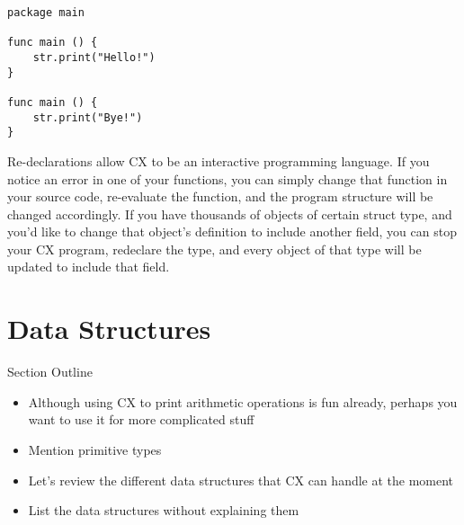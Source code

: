 \documentclass[11pt,fleqn,openany]{book} %
\begin{document}
\begin{lstlisting}[caption={Example Function Redefinition},captionpos=b,label={listing:example-redefinition}]
package main

func main () {
	str.print("Hello!")
}

func main () {
	str.print("Bye!")
}
\end{lstlisting}

Re-declarations allow CX to be an interactive programming language. If you notice an error in one of your functions, you can simply change that function in your source code, re-evaluate the function, and the program structure will be changed accordingly. If you have thousands of objects of certain struct type, and you'd like to change that object's definition to include another field, you can stop your CX program, redeclare the type, and every object of that type will be updated to include that field.




\chapter{Data Structures}
\label{chapter:data-structures}

\begin{remark}
Section Outline
    \begin{itemize}
    	\item Although using CX to print arithmetic operations is fun already, perhaps you want to use it for more complicated stuff
        \item Mention primitive types
        \item Let's review the different data structures that CX can handle at the moment
        \item List the data structures without explaining them        
    \end{itemize}
\end{remark}
\end{document}
